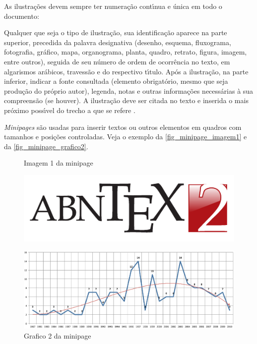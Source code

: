 As ilustra\c{c}\~oes devem sempre ter numera\c{c}\~ao cont\'{\i}nua e \'unica em todo o documento:


\begin{citacao}
	Qualquer que seja o tipo de ilustra\c{c}\~ao, sua identifica\c{c}\~ao aparece na parte
	superior, precedida da palavra designativa (desenho, esquema, fluxograma,
	fotografia, gr\'afico, mapa, organograma, planta, quadro, retrato, figura,
	imagem, entre outros), seguida de seu n\'umero de ordem de ocorr\^encia no texto,
	em algarismos ar\'abicos, travess\~ao e do respectivo t\'{\i}tulo. Ap\'os a ilustra\c{c}\~ao, na
	parte inferior, indicar a fonte consultada (elemento obrigat\'orio, mesmo que
	seja produ\c{c}\~ao do pr\'oprio autor), legenda, notas e outras informa\c{c}\~oes
	necess\'arias \`a sua compreens\~ao (se houver). A ilustra\c{c}\~ao deve ser citada no
	texto e inserida o mais pr\'oximo poss\'{\i}vel do trecho a que se
	refere \cite{nbr14724}.
\end{citacao}

\emph{Minipages} s\~ao usadas para inserir textos ou outros elementos em quadros
com tamanhos e posi\c{c}\~oes controladas. Veja o exemplo da
\autoref{fig_minipage_imagem1} e da \autoref{fig_minipage_grafico2}.

\begin{figure}[H]
	\label{teste}
	\centering
	\begin{minipage}{0.4\textwidth}
		\centering
		\caption{Imagem 1 da minipage} \label{fig_minipage_imagem1}
		\includegraphics[scale=0.9]{USPSC-img/USPSC-modelo-img-marca.pdf}
	\end{minipage}
	\hfill
	\begin{minipage}{0.4\textwidth}
		\centering
		\caption{Grafico 2 da minipage} \label{fig_minipage_grafico2}
		\includegraphics[scale=0.2]{USPSC-img/USPSC-modelo-img-grafico.pdf}
	\end{minipage}
\end{figure}

